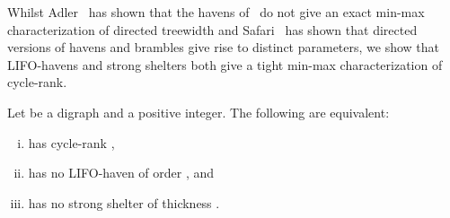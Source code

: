 \documentclass{llncs}
\begin{document}
Whilst Adler~\cite{Adl05} has shown that the havens of~\cite{JRST01} do not give an exact min-max characterization of directed treewidth and Safari~\cite{Saf05} has shown that directed versions of havens and brambles give rise to distinct parameters, we show that LIFO-havens and strong shelters both give a tight min-max characterization of cycle-rank.



\begin{theorem}\label{thm:min-max}
Let  be a digraph and  a positive integer.  The following are equivalent:
\begin{enumerate}[(i) ]
\item  has cycle-rank , 
\item  has no LIFO-haven of order , and
\item  has no strong shelter of thickness .
\end{enumerate}
\end{theorem}
\end{document}
